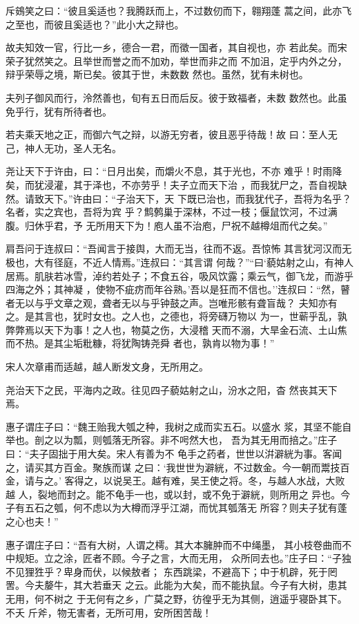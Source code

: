 \documentclass[]{article}
\begin{document}
斥鴳笑之曰：``彼且奚适也？我腾跃而上，不过数仞而下，翱翔蓬
蒿之间，此亦飞之至也，而彼且奚适也？''此小大之辩也。

故夫知效一官，行比一乡，德合一君，而徵一国者，其自视也，亦
若此矣。而宋荣子犹然笑之。且举世而誉之而不加劝，举世而非之而
不加沮，定乎内外之分，辩乎荣辱之境，斯已矣。彼其于世，未数数
然也。虽然，犹有未树也。

夫列子御风而行，泠然善也，旬有五日而后反。彼于致福者，未数
数然也。此虽免乎行，犹有所待者也。

若夫乘天地之正，而御六气之辩，以游无穷者，彼且恶乎待哉！故
曰：至人无己，神人无功，圣人无名。

尧让天下于许由，曰：``日月出矣，而爝火不息，其于光也，不亦
难乎！时雨降矣，而犹浸灌，其于泽也，不亦劳乎！夫子立而天下治
，而我犹尸之，吾自视缺然。请致天下。''许由曰：``子治天下，天
下既已治也，而我犹代子，吾将为名乎？名者，实之宾也，吾将为宾
乎？鹪鹩巢于深林，不过一枝；偃鼠饮河，不过满腹。归休乎君，予
无所用天下为！庖人虽不治庖，尸祝不越樽俎而代之矣。''

肩吾问于连叔曰：``吾闻言于接舆，大而无当，往而不返。吾惊怖
其言犹河汉而无极也，大有径庭，不近人情焉。''连叔曰：``其言谓
何哉？''``曰`藐姑射之山，有神人居焉。肌肤若冰雪，淖约若处子；不食五谷，吸风饮露；乘云气，御飞龙，而游乎四海之外；其神凝
，使物不疵疠而年谷熟。'吾以是狂而不信也。''连叔曰：``然，瞽
者无以与乎文章之观，聋者无以与乎钟鼓之声。岂唯形骸有聋盲哉？
夫知亦有之。是其言也，犹时女也。之人也，之德也，将旁礴万物以
为一，世蕲乎乱，孰弊弊焉以天下为事！之人也，物莫之伤，大浸稽
天而不溺，大旱金石流、土山焦而不热。是其尘垢粃糠，将犹陶铸尧舜
者也，孰肯以物为事！''

宋人次章甫而适越，越人断发文身，无所用之。

尧治天下之民，平海内之政。往见四子藐姑射之山，汾水之阳，杳
然丧其天下焉。

惠子谓庄子曰：``魏王贻我大瓠之种，我树之成而实五石。以盛水
浆，其坚不能自举也。剖之以为瓢，则瓠落无所容。非不呺然大也，
吾为其无用而掊之。''庄子曰：``夫子固拙于用大矣。宋人有善为不
龟手之药者，世世以洴澼絖为事。客闻之，请买其方百金。聚族而谋
之曰：`我世世为澼絖，不过数金。今一朝而鬻技百金，请与之。'
客得之，以说吴王。越有难，吴王使之将。冬，与越人水战，大败越
人，裂地而封之。能不龟手一也，或以封，或不免于澼絖，则所用之
异也。今子有五石之瓠，何不虑以为大樽而浮乎江湖，而忧其瓠落无
所容？则夫子犹有蓬之心也夫！''

惠子谓庄子曰：``吾有大树，人谓之樗。其大本臃肿而不中绳墨，
其小枝卷曲而不中规矩。立之涂，匠者不顾。今子之言，大而无用，
众所同去也。''庄子曰：``子独不见狸狌乎？卑身而伏，以候敖者；
东西跳梁，不避高下；中于机辟，死于罔罟。今夫嫠牛，其大若垂天
之云。此能为大矣，而不能执鼠。今子有大树，患其无用，何不树之
于无何有之乡，广莫之野，彷徨乎无为其侧，逍遥乎寝卧其下。不夭
斤斧，物无害者，无所可用，安所困苦哉！
\end{document}
